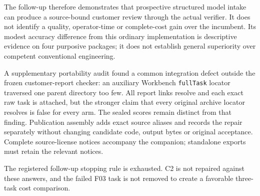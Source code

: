 The follow-up therefore demonstrates that prospective structured model intake can produce a source-bound customer review through the actual verifier. It does not identify a quality, operator-time or complete-cost gain over the incumbent. Its modest accuracy difference from this ordinary implementation is descriptive evidence on four purposive packages; it does not establish general superiority over competent conventional engineering.

A supplementary portability audit found a common integration defect outside the frozen customer-report checker: an auxiliary Workbench \texttt{fullTask} locator traversed one parent directory too few. All report links resolve and each exact raw task is attached, but the stronger claim that every original archive locator resolves is false for every arm. The sealed scores remain distinct from that finding. Publication assembly adds exact source aliases and records the repair separately without changing candidate code, output bytes or original acceptance. Complete source-license notices accompany the companion; standalone exports must retain the relevant notices.

The registered follow-up stopping rule is exhausted. C2 is not repaired against these answers, and the failed F03 task is not removed to create a favorable three-task cost comparison.

